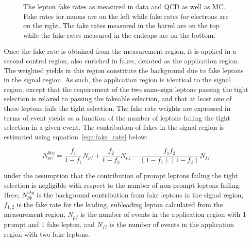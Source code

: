 \begin{figure}[htp]
\caption[Fake rate measurements in data and MC.]{The lepton fake rates as measured in data and QCD as well as \ttbar MC. Fake rates for muons are on the left while fake rates for electrons are on the right. The fake rates
measured in the barrel are on the top while the fake rates measured in the endcaps are on the bottom.}
\label{fig:fakerate}
\end{figure}

Once the fake rate is obtained from the measurement region, it is applied in a second control region, also enriched in fakes, denoted as the application region. The weighted yields in this region constitute the background due to
fake leptons in the signal region. As such, the application region is identical to the signal region, except that the requirement of the two same-sign leptons passing the tight selection is relaxed to passing the fakeable selection,
and that at least one of these leptons fails the tight selection. The fake rate weights are expressed
in terms of event yields as a function of the number of leptons failing the tight selection in a given event. The contribution of fakes in the signal region is estimated using equation~\ref{eqn:fake_rate} below:

\begin{equation}
\label{eqn:fake_rate}
  N_{pp}^{bkg} = \frac{f_{1}}{1-f_{1}}N_{pf} + \frac{f_{2}}{1-f_{2}}N_{pf} - \frac{f_{1}f_{2}}{(1-f_{1})(1-f_{2})}N_{ff}
\end{equation}

\noindent under the assumption that the contribution of prompt leptons failing the tight selection is negligible with respect to the number of non-prompt leptons failing. Here, $N_{pp}^{bkg}$ is the background contribution from fake leptons
in the signal region, $f_{1,2}$ is the fake rate for the leading, subleading lepton calculated from the measurement region, $N_{pf}$ is the number of events in the application region with 1 prompt and 1 fake lepton, and $N_{ff}$ is the
number of events in the application region with two fake leptons.

